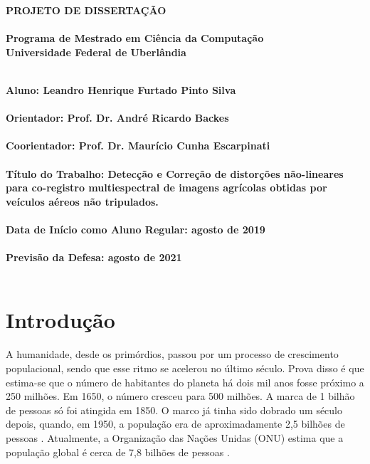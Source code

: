 \documentclass[12pt]{article}
\begin{document}
\rhead{\thepage}

\begin{center}
	\bf{\LARGE{PROJETO DE DISSERTAÇÃO}\\ $\ $\\}
	\Large{Programa de Mestrado em Ciência da Computação\\
		Universidade Federal de Uberlândia}\\ $\ $\\
\end{center}

\begin{center}
	\bf{Aluno: Leandro Henrique Furtado Pinto Silva\\ $\ $\\
		Orientador: Prof. Dr. André Ricardo Backes\\ $\ $\\
		Coorientador: Prof. Dr. Maurício Cunha Escarpinati\\ $\ $\\
		Título do Trabalho: Detecção e Correção de distorções não-lineares para co-registro multiespectral de imagens agrícolas obtidas por veículos aéreos não tripulados.\\ $\ $\\
		Data de Início como Aluno Regular: agosto de 2019\\ $\ $\\
		Previsão da Defesa: agosto de 2021\\ $\ $\\}
\end{center}



\section{Introdução} 
\label{sec:introducao}

A humanidade, desde os primórdios, passou por um processo de crescimento populacional, sendo que esse ritmo se acelerou no último século. Prova disso é que estima-se que o número de habitantes do planeta há dois mil anos fosse próximo a 250 milhões. Em 1650, o número cresceu para 500 milhões. A marca de 1 bilhão de pessoas só foi atingida em 1850. O marco já tinha sido dobrado um século depois, quando, em 1950, a população era de aproximadamente 2,5 bilhões de pessoas \cite{Demografia2020}. Atualmente, a Organização das Nações Unidas (ONU) estima que a população global é cerca de 7,8 bilhões de pessoas \cite{UN2020}.
\end{document}
